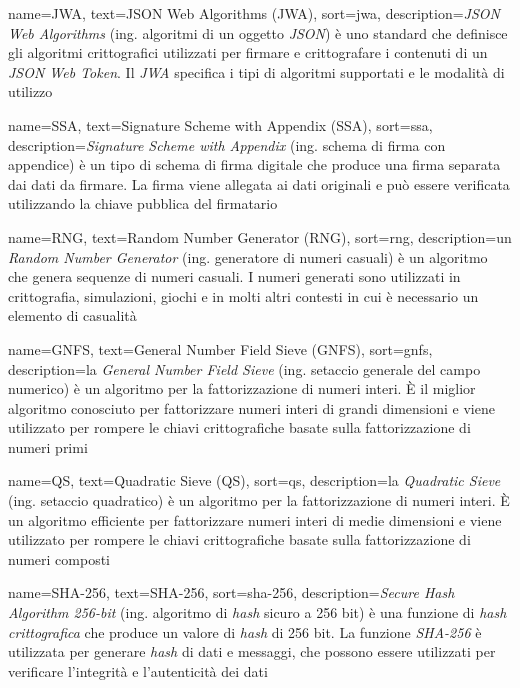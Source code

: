  {
    name=JWA,
    text=JSON Web Algorithms (JWA),
    sort=jwa,
    description={\emph{JSON Web Algorithms} (ing. algoritmi di un oggetto \emph{JSON}) è uno standard che definisce gli algoritmi crittografici utilizzati per firmare e crittografare i contenuti di un \emph{JSON Web Token}. Il \emph{JWA} specifica i tipi di algoritmi supportati e le modalità di utilizzo}
}

 {
    name=SSA,
    text=Signature Scheme with Appendix (SSA),
    sort=ssa,
    description={\emph{Signature Scheme with Appendix} (ing. schema di firma con appendice) è un tipo di schema di firma digitale che produce una firma separata dai dati da firmare. La firma viene allegata ai dati originali e può essere verificata utilizzando la chiave pubblica del firmatario}
}

 {
    name=RNG,
    text=Random Number Generator (RNG),
    sort=rng,
    description={un \emph{Random Number Generator} (ing. generatore di numeri casuali) è un algoritmo che genera sequenze di numeri casuali. I numeri generati sono utilizzati in crittografia, simulazioni, giochi e in molti altri contesti in cui è necessario un elemento di casualità}
}

 {
    name=GNFS,
    text=General Number Field Sieve (GNFS),
    sort=gnfs,
    description={la \emph{General Number Field Sieve} (ing. setaccio generale del campo numerico) è un algoritmo per la fattorizzazione di numeri interi. È il miglior algoritmo conosciuto per fattorizzare numeri interi di grandi dimensioni e viene utilizzato per rompere le chiavi crittografiche basate sulla fattorizzazione di numeri primi}
}

 {
    name=QS,
    text=Quadratic Sieve (QS),
    sort=qs,
    description={la \emph{Quadratic Sieve} (ing. setaccio quadratico) è un algoritmo per la fattorizzazione di numeri interi. È un algoritmo efficiente per fattorizzare numeri interi di medie dimensioni e viene utilizzato per rompere le chiavi crittografiche basate sulla fattorizzazione di numeri composti}
}

 {
    name=SHA-256,
    text=SHA-256,
    sort=sha-256,
    description={\emph{Secure Hash Algorithm 256-bit} (ing. algoritmo di \emph{hash} sicuro a 256 bit) è una funzione di \emph{hash crittografica} che produce un valore di \emph{hash} di 256 bit. La funzione \emph{SHA-256} è utilizzata per generare \emph{hash} di dati e messaggi, che possono essere utilizzati per verificare l'integrità e l'autenticità dei dati}
}

